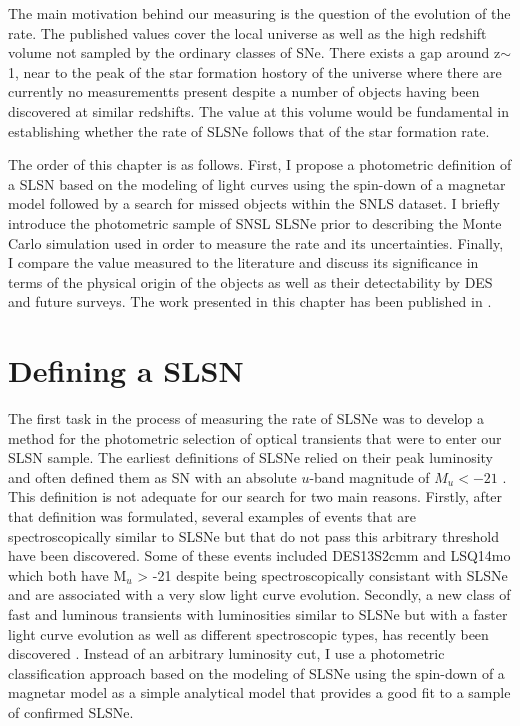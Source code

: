 The main motivation behind our measuring is the question of the evolution of the rate. The published values cover the local universe as well as the high redshift volume not sampled by the ordinary classes of SNe. There exists a gap around z$\sim$1, near to the peak of the star formation hostory of the universe where there are currently no measurementts present despite a number of objects having been discovered at similar redshifts. The value at this volume would be fundamental in establishing whether the rate of SLSNe follows that of the star formation rate.

The order of this chapter is as follows. First, I propose a photometric definition of a SLSN based on the modeling of light curves using the spin-down of a magnetar model followed by a search for missed objects within the SNLS dataset. I briefly introduce the photometric sample of SNSL SLSNe prior to describing the Monte Carlo simulation used in order to measure the rate and its uncertainties. Finally, I compare the value measured to the literature and discuss its significance in terms of the physical origin of the objects as well as their detectability by DES and future surveys. The work presented in this chapter has been published in \citet{Prajs2016}.

\section{Defining a SLSN}
\label{sec:SLSNDefinition}
The first task in the process of measuring the rate of SLSNe was to develop a method for the photometric selection of optical transients that were to enter our SLSN sample. The earliest definitions of SLSNe relied on their peak luminosity and often defined them as SN with an absolute $u$-band magnitude of $M_{u}<-21$ \citep{Gal-Yam2012}. This definition is not adequate for our search for two main reasons. Firstly, after that definition was formulated, several examples of events that are spectroscopically similar to SLSNe but that do not pass this arbitrary threshold have been discovered. Some of these events included DES13S2cmm \citep{Papadopoulos2015} and LSQ14mo \citep{Leloudas2015a} which both have M$_u$ > -21 despite being spectroscopically consistant with SLSNe and are associated with a very slow light curve evolution. Secondly, a new class of fast and luminous transients with luminosities similar to SLSNe but with a faster light curve evolution as well as different spectroscopic types, has recently been discovered \citep{Arcavi2016}. Instead of an arbitrary luminosity cut, I use a photometric classification approach based on the modeling of SLSNe using the spin-down of a magnetar model as a simple analytical model that provides a good fit to a sample of confirmed SLSNe.

